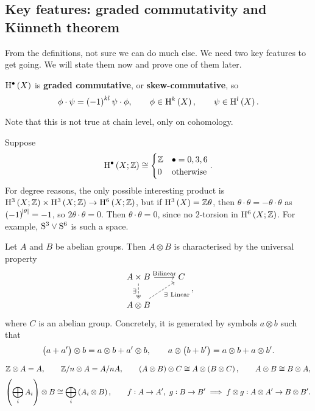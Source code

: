 \pagebreak

\subsection{Key features: graded commutativity and K\"unneth theorem}

From the definitions, not sure we can do much else. We need two key features to get going. We will state them now and prove one of them later.

\begin{proposition}
$ \H^\bullet\br{X} $ is \textbf{graded commutative}, or \textbf{skew-commutative}, so
$$ \phi \cdot \psi = \br{-1}^{kl}\psi \cdot \phi, \qquad \phi \in \H^k\br{X}, \qquad \psi \in \H^l\br{X}. $$
\end{proposition}

Note that this is not true at chain level, only on cohomology.

\begin{example*}
Suppose
$$ \H^\bullet\br{X; \ZZ} \cong
\begin{cases}
\ZZ & \bullet = 0, 3, 6 \\
0 & \text{otherwise}
\end{cases}.
$$
For degree reasons, the only possible interesting product is $ \H^3\br{X; \ZZ} \times \H^3\br{X; \ZZ} \to \H^6\br{X; \ZZ} $, but if $ \H^3\br{X} = \ZZ\theta $, then $ \theta \cdot \theta = -\theta \cdot \theta $ as $ \br{-1}^{\abs{\theta}} = -1 $, so $ 2\theta \cdot \theta = 0 $. Then $ \theta \cdot \theta = 0 $, since no $ 2 $-torsion in $ \H^6\br{X; \ZZ} $. For example, $ \S^3 \vee \S^6 $ is such a space.
\end{example*}

Let $ A $ and $ B $ be abelian groups. Then $ A \otimes B $ is characterised by the universal property
$$
\begin{tikzcd}
A \times B \arrow{r}{\text{Bilinear}} \arrow[twoheadrightarrow, dashed]{d}[swap]{\exists} & C \\
A \otimes B \arrow[dashed]{ur}[swap]{\exists \ \text{Linear}} &
\end{tikzcd},
$$
where $ C $ is an abelian group. Concretely, it is generated by symbols $ a \otimes b $ such that
$$ \br{a + a'} \otimes b = a \otimes b + a' \otimes b, \qquad a \otimes \br{b + b'} = a \otimes b + a \otimes b'. $$

\begin{example*}
$$ \ZZ \otimes A = A, \qquad \ZZ / n \otimes A = A / nA, \qquad \br{A \otimes B} \otimes C \cong A \otimes \br{B \otimes C}, \qquad A \otimes B \cong B \otimes A, $$
$$ \br{\bigoplus_i A_i} \otimes B \cong \bigoplus_i \br{A_i \otimes B}, \qquad f : A \to A', \ g : B \to B' \implies f \otimes g : A \otimes A' \to B \otimes B'. $$
\end{example*}

